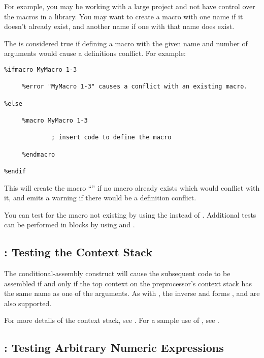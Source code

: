 For example, you may be working with a large project and not have control
over the macros in a library. You may want to create a macro with one
name if it doesn't already exist, and another name if one with that name
does exist.

The  is considered true if defining a macro with the given name
and number of arguments would cause a definitions conflict. For example:

\begin{lstlisting}
%ifmacro MyMacro 1-3

     %error "MyMacro 1-3" causes a conflict with an existing macro.

%else

     %macro MyMacro 1-3

             ; insert code to define the macro

     %endmacro

%endif
\end{lstlisting}

This will create the macro ``'' if no macro already exists which
would conflict with it, and emits a warning if there would be a definition
conflict.

You can test for the macro not existing by using the 
instead of . Additional tests can be performed in
 blocks by using  and
.

\subsection{: Testing the Context Stack
}
\label{subsec:ifctx}

The conditional-assembly construct  will cause the
subsequent code to be assembled if and only if the top context on
the preprocessor's context stack has the same name as one of the arguments.
As with , the inverse and  forms ,
 and  are also supported.

For more details of the context stack, see .
For a sample use of , see .

\subsection{: Testing Arbitrary Numeric Expressions}
\label{subsec:if}

